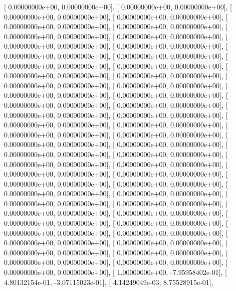 \documentclass{article}
\begin{document}
       [  0.00000000e+00,   0.00000000e+00],
       [  0.00000000e+00,   0.00000000e+00],
       [  0.00000000e+00,   0.00000000e+00],
       [  0.00000000e+00,   0.00000000e+00],
       [  0.00000000e+00,   0.00000000e+00],
       [  0.00000000e+00,   0.00000000e+00],
       [  0.00000000e+00,   0.00000000e+00],
       [  0.00000000e+00,   0.00000000e+00],
       [  0.00000000e+00,   0.00000000e+00],
       [  0.00000000e+00,   0.00000000e+00],
       [  0.00000000e+00,   0.00000000e+00],
       [  0.00000000e+00,   0.00000000e+00],
       [  0.00000000e+00,   0.00000000e+00],
       [  0.00000000e+00,   0.00000000e+00],
       [  0.00000000e+00,   0.00000000e+00],
       [  0.00000000e+00,   0.00000000e+00],
       [  0.00000000e+00,   0.00000000e+00],
       [  0.00000000e+00,   0.00000000e+00],
       [  0.00000000e+00,   0.00000000e+00],
       [  0.00000000e+00,   0.00000000e+00],
       [  0.00000000e+00,   0.00000000e+00],
       [  0.00000000e+00,   0.00000000e+00],
       [  0.00000000e+00,   0.00000000e+00],
       [  0.00000000e+00,   0.00000000e+00],
       [  0.00000000e+00,   0.00000000e+00],
       [  0.00000000e+00,   0.00000000e+00],
       [  0.00000000e+00,   0.00000000e+00],
       [  0.00000000e+00,   0.00000000e+00],
       [  0.00000000e+00,   0.00000000e+00],
       [  0.00000000e+00,   0.00000000e+00],
       [  0.00000000e+00,   0.00000000e+00],
       [  0.00000000e+00,   0.00000000e+00],
       [  0.00000000e+00,   0.00000000e+00],
       [  0.00000000e+00,   0.00000000e+00],
       [  0.00000000e+00,   0.00000000e+00],
       [  0.00000000e+00,   0.00000000e+00],
       [  0.00000000e+00,   0.00000000e+00],
       [  0.00000000e+00,   0.00000000e+00],
       [  0.00000000e+00,   0.00000000e+00],
       [  0.00000000e+00,   0.00000000e+00],
       [  0.00000000e+00,   0.00000000e+00],
       [  0.00000000e+00,   0.00000000e+00],
       [  0.00000000e+00,   0.00000000e+00],
       [  0.00000000e+00,   0.00000000e+00],
       [  0.00000000e+00,   0.00000000e+00],
       [  0.00000000e+00,   0.00000000e+00],
       [  0.00000000e+00,   0.00000000e+00],
       [  0.00000000e+00,   0.00000000e+00],
       [  0.00000000e+00,   0.00000000e+00],
       [  0.00000000e+00,   0.00000000e+00],
       [  0.00000000e+00,   0.00000000e+00],
       [  0.00000000e+00,   0.00000000e+00],
       [  0.00000000e+00,   0.00000000e+00],
       [  0.00000000e+00,   0.00000000e+00],
       [  0.00000000e+00,   0.00000000e+00],
       [  1.00000000e+00,  -7.95958402e-01],
       [  4.80132154e-01,  -3.07115023e-01],
       [  4.14249049e-03,   8.75528915e-01],
\end{document}
